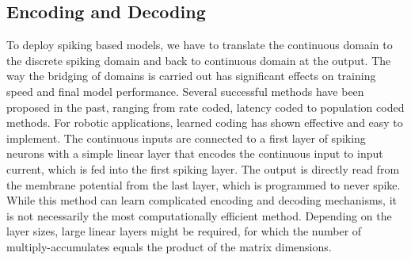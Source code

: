 \subsection{Encoding and Decoding}
To deploy spiking based models, we have to translate the continuous domain to the discrete spiking domain and back to continuous domain at the output. The way the bridging of domains is carried out has significant effects on training speed and final model performance. Several successful methods have been proposed in the past, ranging from rate coded, latency coded to population coded methods. For robotic applications, learned coding has shown effective and easy to implement\cite{stroobants_neuromorphic_2022}. The continuous inputs are connected to a first layer of spiking neurons with a simple linear layer that encodes the continuous input to input current, which is fed into the first spiking layer. The output is directly read from the membrane potential from the last layer, which is programmed to never spike. While this method can learn complicated encoding and decoding mechanisms, it is not necessarily the most computationally efficient method. Depending on the layer sizes, large linear layers might be required, for which the number of multiply-accumulates equals the product of the matrix dimensions.

